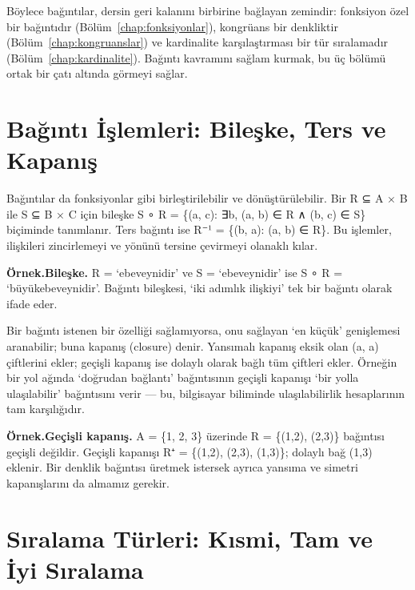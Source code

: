 Böylece bağıntılar, dersin geri kalanını birbirine bağlayan zemindir: fonksiyon özel bir bağıntıdır (Bölüm~\ref{chap:fonksiyonlar}), kongrüans bir denkliktir (Bölüm~\ref{chap:kongruanslar}) ve kardinalite karşılaştırması bir tür sıralamadır (Bölüm~\ref{chap:kardinalite}). Bağıntı kavramını sağlam kurmak, bu üç bölümü ortak bir çatı altında görmeyi sağlar.

\section{Bağıntı İşlemleri: Bileşke, Ters ve Kapanış}

Bağıntılar da fonksiyonlar gibi birleştirilebilir ve dönüştürülebilir. Bir R ⊆ A × B ile S ⊆ B × C için bileşke S ∘ R = \{(a, c): ∃b, (a, b) ∈ R ∧ (b, c) ∈ S\} biçiminde tanımlanır. Ters bağıntı ise R⁻¹ = \{(b, a): (a, b) ∈ R\}. Bu işlemler, ilişkileri zincirlemeyi ve yönünü tersine çevirmeyi olanaklı kılar.

\begin{tcolorbox}[bookbox,colback=cEx]\textbf{\textsf{\textcolor{cAcc}{Örnek.}}}\quad \textbf{Bileşke. }R = ‘ebeveynidir’ ve S = ‘ebeveynidir’ ise S ∘ R = ‘büyükebeveynidir’. Bağıntı bileşkesi, ‘iki adımlık ilişkiyi’ tek bir bağıntı olarak ifade eder.\end{tcolorbox}

Bir bağıntı istenen bir özelliği sağlamıyorsa, onu sağlayan ‘en küçük’ genişlemesi aranabilir; buna kapanış (closure) denir. Yansımalı kapanış eksik olan (a, a) çiftlerini ekler; geçişli kapanış ise dolaylı olarak bağlı tüm çiftleri ekler. Örneğin bir yol ağında ‘doğrudan bağlantı’ bağıntısının geçişli kapanışı ‘bir yolla ulaşılabilir’ bağıntısını verir — bu, bilgisayar biliminde ulaşılabilirlik hesaplarının tam karşılığıdır.

\begin{tcolorbox}[bookbox,colback=cEx]\textbf{\textsf{\textcolor{cAcc}{Örnek.}}}\quad \textbf{Geçişli kapanış. }A = \{1, 2, 3\} üzerinde R = \{(1,2), (2,3)\} bağıntısı geçişli değildir. Geçişli kapanışı R⁺ = \{(1,2), (2,3), (1,3)\}; dolaylı bağ (1,3) eklenir. Bir denklik bağıntısı üretmek istersek ayrıca yansıma ve simetri kapanışlarını da almamız gerekir.\end{tcolorbox}

\section{Sıralama Türleri: Kısmi, Tam ve İyi Sıralama}

